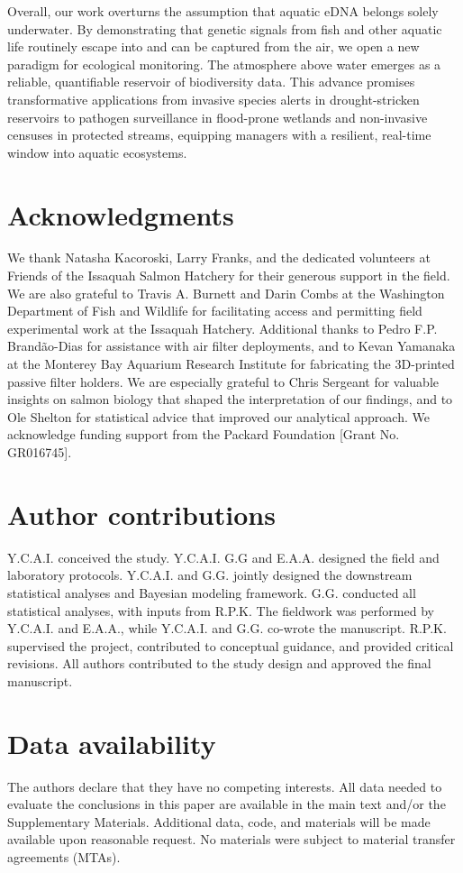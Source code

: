 \documentclass{article}
\begin{document}
Overall, our work overturns the assumption that aquatic eDNA belongs solely underwater. By demonstrating that genetic signals from fish and other aquatic life routinely escape into and can be captured from the air, we open a new paradigm for ecological monitoring. The atmosphere above water emerges as a reliable, quantifiable reservoir of biodiversity data. This advance promises transformative applications from invasive species alerts in drought-stricken reservoirs to pathogen surveillance in flood-prone wetlands and non-invasive censuses in protected streams, equipping managers with a resilient, real-time window into aquatic ecosystems.

\section*{Acknowledgments}
We thank Natasha Kacoroski, Larry Franks, and the dedicated volunteers at Friends of the Issaquah Salmon Hatchery for their generous support in the field. We are also grateful to Travis A. Burnett and Darin Combs at the Washington Department of Fish and Wildlife for facilitating access and permitting field experimental work at the Issaquah Hatchery. Additional thanks to Pedro F.P. Brandão-Dias for assistance with air filter deployments, and to Kevan Yamanaka at the Monterey Bay Aquarium Research Institute for fabricating the 3D-printed passive filter holders. We are especially grateful to Chris Sergeant for valuable insights on salmon biology that shaped the interpretation of our findings, and to Ole Shelton for statistical advice that improved our analytical approach. We acknowledge funding support from the Packard Foundation [Grant No. GR016745].

\section*{Author contributions}
Y.C.A.I. conceived the study. Y.C.A.I. G.G and E.A.A. designed the field and laboratory protocols. Y.C.A.I. and G.G. jointly designed the downstream statistical analyses and Bayesian modeling framework. G.G. conducted all statistical analyses, with inputs from R.P.K. The fieldwork was performed by Y.C.A.I. and E.A.A., while Y.C.A.I. and G.G. co-wrote the manuscript. R.P.K. supervised the project, contributed to conceptual guidance, and provided critical revisions. All authors contributed to the study design and approved the final manuscript.  

\section*{Data availability}
The authors declare that they have no competing interests. All data needed to evaluate the conclusions in this paper are available in the main text and/or the Supplementary Materials. Additional data, code, and materials will be made available upon reasonable request. No materials were subject to material transfer agreements (MTAs).

\clearpage

\end{document}
